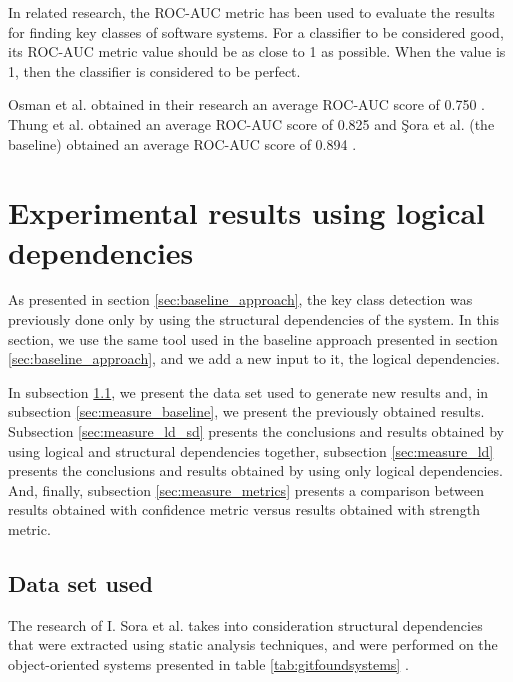 \documentclass[runningheads]{comsis2}
\begin{document}
In related research, the ROC-AUC metric has been used to evaluate the results for finding key classes of software systems.
For a classifier to be considered good, its ROC-AUC metric value should be as close to 1 as possible. When the value is 1, then the classifier is considered to be perfect.

Osman et al. obtained in their research an average ROC-AUC score of 0.750 \cite{6676885}. Thung et al. obtained an average ROC-AUC score of 0.825 \cite{rocclasification}  and Şora et al. (the baseline) obtained an average ROC-AUC score of 0.894 \cite{Finding-key-classes}.



\section{Experimental results using logical dependencies}
\label{sec:current_measurements}


As presented in section \ref{sec:baseline_approach}, the key class detection was previously done only by using the structural dependencies of the system. 
In this section, we use the same tool used in the baseline approach presented in section \ref{sec:baseline_approach}, and we add a new input to it, the logical dependencies. 

In subsection \ref{sec:dataset}, we present the data set used to generate new results and, in subsection \ref{sec:measure_baseline}, we present the previously obtained results. Subsection \ref{sec:measure_ld_sd} presents the conclusions and results obtained by using logical and structural dependencies together, subsection \ref{sec:measure_ld} presents the conclusions and results obtained by using only logical dependencies. And, finally, subsection \ref{sec:measure_metrics} presents a comparison between results obtained with confidence metric versus results obtained with strength metric.



\subsection{Data set used}
\label{sec:dataset}


The research of I. Sora et al. takes into consideration structural dependencies that were extracted using static analysis techniques, and were performed on the object-oriented systems presented in table \ref{tab:gitfoundsystems} \cite{Finding-key-classes}.
\end{document}
